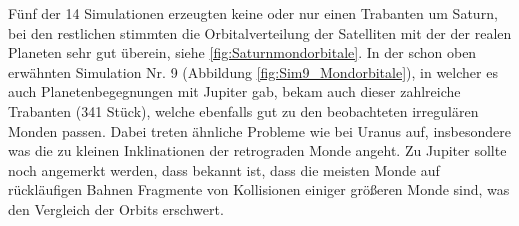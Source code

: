 \documentclass[12pt,a4paper,twoside]{article}
\renewcommand{\cite}{\citep}
\begin{document}
Fünf der 14 Simulationen erzeugten keine oder nur einen Trabanten um Saturn, bei den restlichen stimmten die Orbitalverteilung der Satelliten mit der der realen Planeten sehr gut überein, siehe \ref{fig:Saturnmondorbitale}\cite{Nesvorny2007}.
In der schon oben erwähnten Simulation Nr. 9 (Abbildung \ref{fig:Sim9_Mondorbitale}), in welcher es auch Planetenbegegnungen mit Jupiter gab, bekam auch dieser zahlreiche Trabanten (341 Stück), welche ebenfalls gut zu den beobachteten irregulären Monden passen. Dabei treten ähnliche Probleme wie bei Uranus auf, insbesondere was die zu kleinen Inklinationen der retrograden Monde angeht.
Zu Jupiter sollte noch angemerkt werden, dass bekannt ist, dass die meisten Monde auf rückläufigen Bahnen Fragmente von Kollisionen einiger größeren Monde sind, was den Vergleich der Orbits erschwert\cite{Nesvorny2004,Nesvorny2007}.
\end{document}
